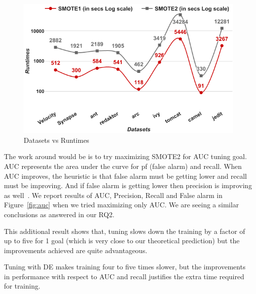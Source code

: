   \begin{figure}[!htbp]
  \captionsetup{justification=centering}
  \includegraphics[width=\linewidth]{./fig/runtimes.png}
  \caption{Datasets vs Runtimes}
  \label{runtime}
\vspace{-0.7cm}
\end{figure}
  
  The work around would be is to try maximizing SMOTE2 for AUC tuning goal. AUC represents the area under the curve for pf (false alarm) and recall. When AUC improves, the heuristic is that false alarm must be getting lower and recall must be improving. And if false alarm is getting lower then precision is improving as well~\cite{menzies2007data}. We report results of AUC, Precision, Recall and False alarm in Figure~\ref{fig:auc} when we tried maximizing only AUC. We are seeing a similar conclusions as answered in our RQ2. 
  
  This additional result shows that, tuning slows down the training by a factor of up to
  five for 1 goal (which is very close to our theoretical prediction) but the improvements achieved are quite advantageous.

\begin{lesson1}
    Tuning with DE makes training four to five times slower, but the improvements in performance with respect to AUC and recall justifies the extra time required for training.
\end{lesson1}
